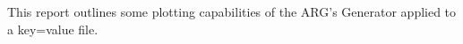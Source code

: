 This report outlines some plotting capabilities of the ARG's Generator applied to a key=value file.
